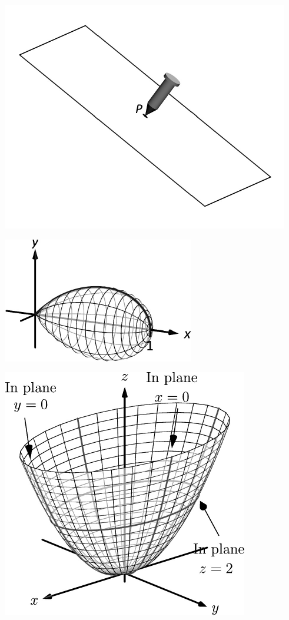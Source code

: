 \documentclass[10pt]{article}
\begin{document}
\includegraphics{figplanes_intro_3DBW.pdf}
\texttt{}

\includegraphics{figpolcalc8a_3DBW.pdf}
\texttt{}

\includegraphics{figquadratic_parb_3DBW.pdf}
\texttt{}
\end{document}

